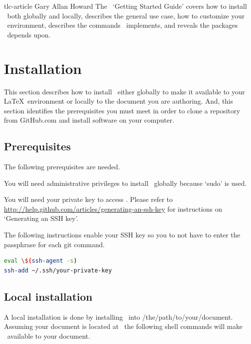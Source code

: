 \documentclass[12pt]{tlc-article}
\begin{document}
\tlcTitlePageAndTableOfContents
  {tlc-article}
  {Gary Allan Howard}
  {The \tlcA\ `Getting Started Guide' covers how to install \tlcA\ both globally
   and locally, describes the general use case, how to customize your \tlcA\
   environment, describes the commands \tlcA\ implements, and reveals the
   packages \tlcA\ depends upon.}

\section{Installation}
This section describes how to install \tlcA\ either globally to make it
available to your \LaTeX\ environment or locally to the document you are
authoring.  And, this section identifies the prerequisites you must meet in
order to clone a repository from GitHub.com and install software on your
computer.

\subsection{Prerequisites}
The following prerequisites are needed.
\begin{description}[style=nextline]
  \item[Administrative privilege] You will need administrative privileges to
    install \tlcA\ globally because `sudo' is used.

  \item[SSH key] You will need your private key to access \gitHub.  Please refer
    to \url{http://help.github.com/articles/generating-an-ssh-key} for
    instructions on `Generating an SSH key'.

  \item[Enable your SSH key] The following instructions enable your SSH key so
    you to not have to enter the passphrase for each git command.
\end{description}

\begin{lstlisting}[language=bash]
eval \$(ssh-agent -s)
ssh-add ~/.ssh/your-private-key
\end{lstlisting}

\subsection{Local installation}
A local installation is done by installing \tlcA\ into
/the/path/to/your/document.  Assuming your document is located at \tlcMyDoc\ the
following shell commands will make \tlcA\ available to your document.
\end{document}
